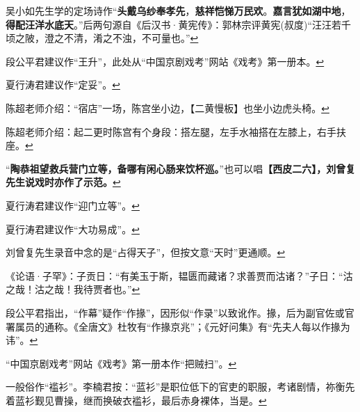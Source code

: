   吴小如先生学的定场诗作``\textbf{头戴乌纱奉孝先}，\textbf{慈祥恺悌万民欢}。\textbf{嘉言犹如湖中地}，\textbf{得配汪洋水底天}。''后两句源自《后汉书·黄宪传》：郭林宗评黄宪(叔度)``汪汪若千顷之陂，澄之不清，淆之不浊，不可量也。''\protect\hyperlink{fnref139}{↩}
\item
  \leavevmode\hypertarget{fn140}{}%
  段公平君建议作``王升''，此处从``中国京剧戏考''网站《戏考》第一册本。\protect\hyperlink{fnref140}{↩}
\item
  \leavevmode\hypertarget{fn141}{}%
  夏行涛君建议作``定妥''。\protect\hyperlink{fnref141}{↩}
\item
  \leavevmode\hypertarget{fn142}{}%
  陈超老师介绍：``宿店''一场，陈宫坐小边，【二黄慢板】也坐小边虎头椅。\protect\hyperlink{fnref142}{↩}
\item
  \leavevmode\hypertarget{fn143}{}%
  陈超老师介绍：起二更时陈宫有个身段：搭左腿，左手水袖搭在左膝上，右手扶座。\protect\hyperlink{fnref143}{↩}
\item
  \leavevmode\hypertarget{fn144}{}%
  ``\textbf{陶恭祖望救兵营门立等，备哪有闲心肠来饮杯巡。}''也可以唱\textbf{【西皮二六】，刘曾复先生说戏时亦作了示范。}\protect\hyperlink{fnref144}{↩}
\item
  \leavevmode\hypertarget{fn145}{}%
  夏行涛君建议作``迎门立等''。\protect\hyperlink{fnref145}{↩}
\item
  \leavevmode\hypertarget{fn146}{}%
  夏行涛君建议作``大功易成''。\protect\hyperlink{fnref146}{↩}
\item
  \leavevmode\hypertarget{fn147}{}%
  刘曾复先生录音中念的是``占得天子''，但按文意``天时''更通顺。\protect\hyperlink{fnref147}{↩}
\item
  \leavevmode\hypertarget{fn148}{}%
  《论语·子罕》：子贡日：``有美玉于斯，韫匮而藏诸？求善贾而沽诸？''子日：``沽之哉！沽之哉！我待贾者也。''\protect\hyperlink{fnref148}{↩}
\item
  \leavevmode\hypertarget{fn149}{}%
  段公平君指出，``作幕''疑作``作掾''，因形似``作录''以致讹作。掾，后为副官佐或官署属员的通称。《全唐文》杜牧有``作掾京兆''；《元好问集》有``先夫人每以作掾为讳''。\protect\hyperlink{fnref149}{↩}
\item
  \leavevmode\hypertarget{fn150}{}%
  ``中国京剧戏考''网站《戏考》第一册本作``把贼扫''。\protect\hyperlink{fnref150}{↩}
\item
  \leavevmode\hypertarget{fn151}{}%
  一般俗作``褴衫''。李楠君按：``蓝衫''是职位低下的官吏的职服，考诸剧情，祢衡先着蓝衫觐见曹操，继而换破衣褴衫，最后赤身裸体，当是。\protect\hyperlink{fnref151}{↩}
\item
